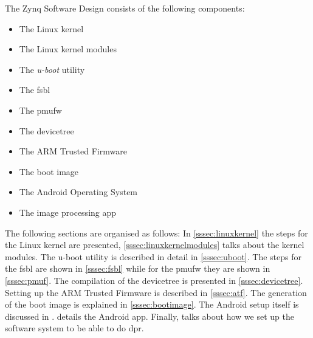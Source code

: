 The Zynq Software Design consists of the following components:
\begin{itemize}
	\item The Linux kernel
	\item The Linux kernel modules
	\item The \emph{u-boot} utility
	\item The \gls{fsbl}
	\item The \gls{pmufw}
	\item The devicetree
	\item The ARM Trusted Firmware
	\item The boot image
	\item The Android Operating System
	\item The image processing app
\end{itemize}

The following sections are organised as follows: In \cref{sssec:linuxkernel} the steps for the Linux kernel are presented, \cref{sssec:linuxkernelmodules} talks about the kernel modules. The u-boot utility is described in detail in \cref{sssec:uboot}. The steps for the \gls{fsbl} are shown in \cref{sssec:fsbl} while for the \gls{pmufw} they are shown in \cref{sssec:pmuf}. The compilation of the devicetree is presented in \cref{sssec:devicetree}. Setting up the ARM Trusted Firmware is described in \cref{sssec:atf}. The generation of the boot image is explained in \cref{sssec:bootimage}. The Android setup itself is discussed in .  details the Android app. Finally,  talks about how we set up
the software system to be able to do \gls{dpr}.
